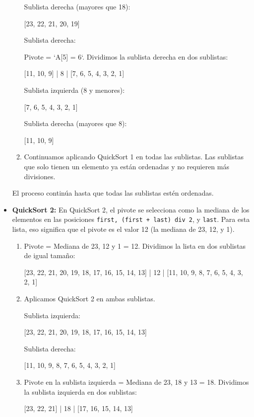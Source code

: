\documentclass[answers, 11pt]{exam}
\begin{document}
\begin{questions}
\begin{solution}
\begin{itemize}
\begin{enumerate}
    Sublista derecha (mayores que 18):
  
    [23, 22, 21, 20, 19]
  
    Sublista derecha:
  
    Pivote = `A[5] = 6`. Dividimos la sublista derecha en dos sublistas:
    
    [11, 10, 9] | 8 | [7, 6, 5, 4, 3, 2, 1]
  
    Sublista izquierda (8 y menores):
  
    [7, 6, 5, 4, 3, 2, 1]
    
    Sublista derecha (mayores que 8):
    
    [11, 10, 9]
  
    \item Continuamos aplicando QuickSort 1 en todas las sublistas. Las sublistas que solo tienen un elemento ya están ordenadas y no requieren más divisiones.
  \end{enumerate}

   El proceso continúa hasta que todas las sublistas estén ordenadas.

  \item \textbf{QuickSort 2:}
  En QuickSort 2, el pivote se selecciona como la mediana de los elementos en 
  las posiciones \verb|first, (first + last) div 2|, y \verb|last|. Para esta lista, eso 
  significa que el pivote es el valor 12 (la mediana de 23, 12, y 1).

  \begin{enumerate}
    \item Pivote = Mediana de 23, 12 y 1 = 12. Dividimos la lista en dos sublistas de igual tamaño:

    
    [23, 22, 21, 20, 19, 18, 17, 16, 15, 14, 13] | 12 | [11, 10, 9, 8, 7, 6, 5, 4, 3, 2, 1]
    
    \item Aplicamos QuickSort 2 en ambas sublistas.
    
    Sublista izquierda:
    
    [23, 22, 21, 20, 19, 18, 17, 16, 15, 14, 13]
    
    Sublista derecha:
    
    [11, 10, 9, 8, 7, 6, 5, 4, 3, 2, 1]
    
    \item Pivote en la sublista izquierda = Mediana de 23, 18 y 13 = 18. Dividimos la sublista izquierda en dos sublistas:
    
    [23, 22, 21] | 18 | [17, 16, 15, 14, 13]
    

\end{enumerate}
\end{itemize}
\end{solution}
\end{questions}
\end{document}
